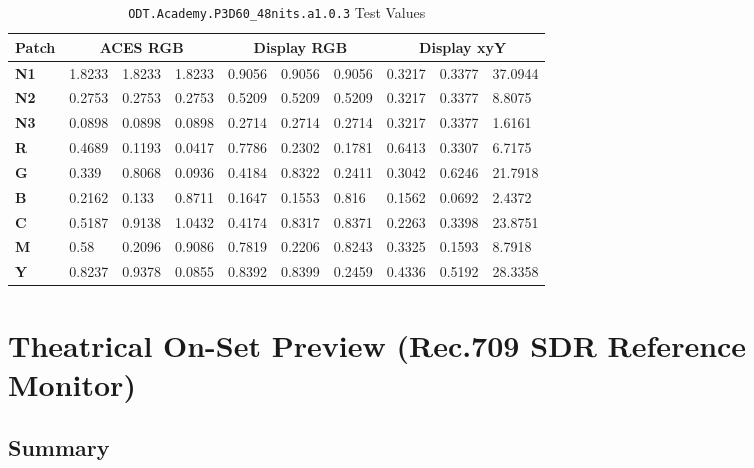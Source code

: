 \begin{table}[ht!]
    \centering
    \begin{tabular}{|l|l|l|l|l|l|l|l|l|l|}
        \hline
        \multicolumn{1}{|c|}{\textbf{Patch}} & \multicolumn{3}{c|}{\textbf{ACES RGB}} & \multicolumn{3}{c|}{\textbf{Display RGB}} & \multicolumn{3}{c|}{\textbf{Display xyY}} \\ \hline
        \textbf{N1} & 1.8233 & 1.8233 & 1.8233 & 0.9056 & 0.9056 & 0.9056 & 0.3217 & 0.3377 & 37.0944 \\ \hline
        \textbf{N2} & 0.2753 & 0.2753 & 0.2753 & 0.5209 & 0.5209 & 0.5209 & 0.3217 & 0.3377 & 8.8075  \\ \hline
        \textbf{N3} & 0.0898 & 0.0898 & 0.0898 & 0.2714 & 0.2714 & 0.2714 & 0.3217 & 0.3377 & 1.6161  \\ \hline
        \textbf{R}  & 0.4689 & 0.1193 & 0.0417 & 0.7786 & 0.2302 & 0.1781 & 0.6413 & 0.3307 & 6.7175  \\ \hline
        \textbf{G}  & 0.339  & 0.8068 & 0.0936 & 0.4184 & 0.8322 & 0.2411 & 0.3042 & 0.6246 & 21.7918 \\ \hline
        \textbf{B}  & 0.2162 & 0.133  & 0.8711 & 0.1647 & 0.1553 & 0.816  & 0.1562 & 0.0692 & 2.4372  \\ \hline
        \textbf{C}  & 0.5187 & 0.9138 & 1.0432 & 0.4174 & 0.8317 & 0.8371 & 0.2263 & 0.3398 & 23.8751 \\ \hline
        \textbf{M}  & 0.58   & 0.2096 & 0.9086 & 0.7819 & 0.2206 & 0.8243 & 0.3325 & 0.1593 & 8.7918  \\ \hline
        \textbf{Y}  & 0.8237 & 0.9378 & 0.0855 & 0.8392 & 0.8399 & 0.2459 & 0.4336 & 0.5192 & 28.3358 \\ \hline
        \end{tabular}
        \caption[Theatrical DI (P3D60) - Test Values]{\texttt{ODT.Academy.P3D60\_48nits.a1.0.3} Test Values}
        \label{tab:testValues-p3d60}
\end{table}

\clearpage
\section{Theatrical On-Set Preview (Rec.709 SDR Reference Monitor)}
\label{sec:ot-app-rec709d60sim}

\subsection{Summary}
\label{subsec:summary-rec709d60sim}


